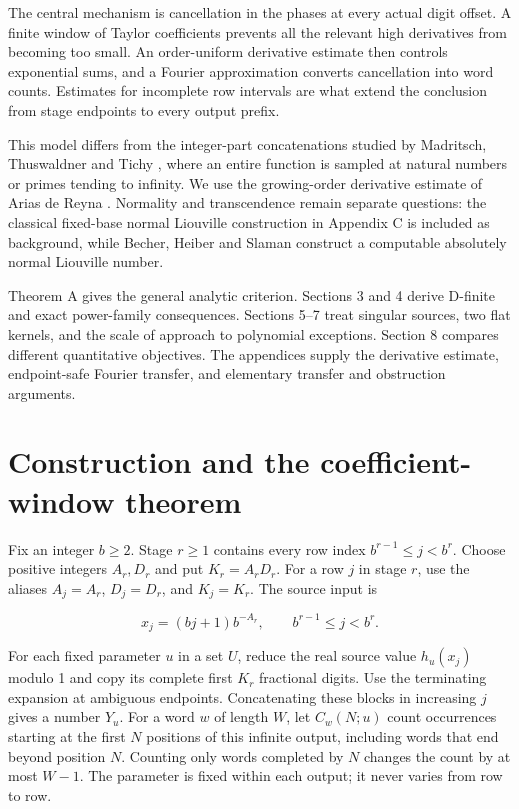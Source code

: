 \documentclass[11pt,a4paper]{article}
\begin{document}
The central mechanism is cancellation in the phases at every actual
digit offset. A finite window of Taylor coefficients prevents all the
relevant high derivatives from becoming too small. An order-uniform
derivative estimate then controls exponential sums, and a Fourier
approximation converts cancellation into word counts. Estimates for
incomplete row intervals are what extend the conclusion from stage
endpoints to every output prefix.

This model differs from the integer-part concatenations studied by
Madritsch, Thuswaldner and Tichy \cite{madritsch}, where an entire
function is sampled at natural numbers or primes tending to infinity. We
use the growing-order derivative estimate of Arias de Reyna
\cite{arias}. Normality and transcendence remain separate questions: the
classical fixed-base normal Liouville construction in Appendix C is
included as background, while Becher, Heiber and Slaman \cite{becher}
construct a computable absolutely normal Liouville number.

Theorem A gives the general analytic criterion. Sections 3 and 4 derive
D-finite and exact power-family consequences. Sections 5--7 treat
singular sources, two flat kernels, and the scale of approach to
polynomial exceptions. Section 8 compares different quantitative
objectives. The appendices supply the derivative estimate, endpoint-safe
Fourier transfer, and elementary transfer and obstruction arguments.

\section{Construction and the coefficient-window
theorem}\label{construction-and-the-coefficient-window-theorem}

Fix an integer \(b\ge2\). Stage \(r\ge1\) contains every row index
\(b^{r-1}\le j< b^r\). Choose positive integers \(A_r,D_r\) and put
\(K_r=A_rD_r\). For a row \(j\) in stage \(r\), use the aliases
\(A_j=A_r\), \(D_j=D_r\), and \(K_j=K_r\). The source input is

\[
x_j=(bj+1)b^{-A_r},\qquad b^{r-1}\le j< b^r.
\]

For each fixed parameter \(u\) in a set \(U\), reduce the real source
value \(h_u(x_j)\) modulo 1 and copy its complete first \(K_r\)
fractional digits. Use the terminating expansion at ambiguous endpoints.
Concatenating these blocks in increasing \(j\) gives a number \(Y_u\).
For a word \(w\) of length \(W\), let \(C_w(N;u)\) count occurrences
starting at the first \(N\) positions of this infinite output, including
words that end beyond position \(N\). Counting only words completed by
\(N\) changes the count by at most \(W-1\). The parameter is fixed
within each output; it never varies from row to row.
\end{document}
